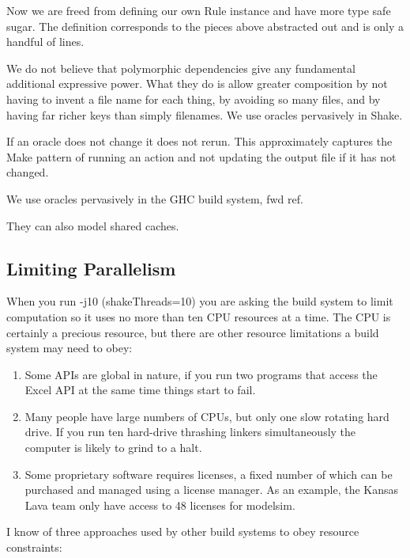 Now we are freed from defining our own Rule instance and have more type safe sugar. The definition corresponds to the pieces above abstracted out and is only a handful of lines.

We do not believe that polymorphic dependencies give any fundamental additional expressive power. What they do is allow greater composition by not having to invent a file name for each thing, by avoiding so many files, and by having far richer keys than simply filenames. We use oracles pervasively in Shake.

If an oracle does not change it does not rerun. This approximately captures the Make pattern of running an action and not updating the output file if it has not changed.

We use oracles pervasively in the GHC build system, fwd ref.

They can also model shared caches.

\subsection{Limiting Parallelism}

When you run -j10 (shakeThreads=10) you are asking the build system to limit computation so it uses no more than ten CPU resources at a time. The CPU is certainly a precious resource, but there are other resource limitations a build system may need to obey:

\begin{enumerate}
\item Some APIs are global in nature, if you run two programs that access the Excel API at the same time things start to fail.
\item Many people have large numbers of CPUs, but only one slow rotating hard drive. If you run ten hard-drive thrashing linkers simultaneously the computer is likely to grind to a halt.
\item Some proprietary software requires licenses, a fixed number of which can be purchased and managed using a license manager. As an example, the Kansas Lava team only have access to 48 licenses for modelsim.
\end{enumerate}

I know of three approaches used by other build systems to obey resource constraints:

